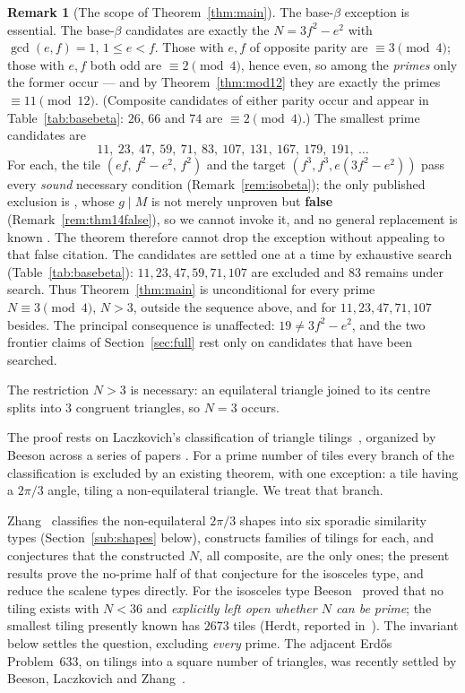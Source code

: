 \documentclass[11pt,reqno]{amsart}
\theoremstyle{plain}
\theoremstyle{definition}
\newtheorem{remark}[theorem]{Remark}
\begin{document}
\begin{remark}[The scope of Theorem~\ref{thm:main}]\label{rem:mainscope}
The base-$\beta$ exception is essential. The base-$\beta$ candidates are exactly the $N=3f^2-e^2$ with
$\gcd(e,f)=1$, $1\le e<f$. Those with $e,f$ of opposite parity are $\equiv3\pmod4$; those with $e,f$
both odd are $\equiv2\pmod4$, hence even, so among the \emph{primes} only the former occur --- and by
Theorem~\ref{thm:mod12} they are exactly the primes $\equiv11\pmod{12}$. (Composite candidates of
either parity occur and appear in Table~\ref{tab:basebeta}: $26$, $66$ and $74$ are $\equiv2\pmod4$.)
The smallest prime candidates are
\[ 11,\ 23,\ 47,\ 59,\ 71,\ 83,\ 107,\ 131,\ 167,\ 179,\ 191,\ \dots \]
For each, the tile $(ef,\,f^2-e^2,\,f^2)$ and the target $(f^3,f^3,e(3f^2-e^2))$ pass every
\emph{sound} necessary condition (Remark~\ref{rem:isobeta}); the only published exclusion is
\cite[Thm.~14]{BeesonIII}, whose $g\mid M$ is not merely unproven but \textbf{false}
(Remark~\ref{rem:thm14false}), so we cannot invoke it, and no general replacement is known \cite{Companion}. The theorem therefore cannot drop the exception without appealing to that
false citation. The candidates are settled one at a time by exhaustive search
(Table~\ref{tab:basebeta}): $11,23,47,59,71,107$ are excluded and $83$ remains under search. Thus
Theorem~\ref{thm:main} is unconditional for every prime
$N\equiv3\pmod4$, $N>3$, outside the sequence above, and for $11,23,47,71,107$ besides. The
principal consequence is unaffected: $19\ne3f^2-e^2$, and the two frontier claims of
Section~\ref{sec:full} rest only on candidates that have been searched.
\end{remark}

\noindent The restriction $N>3$ is necessary: an equilateral triangle joined to its centre splits
into $3$ congruent triangles, so $N=3$ occurs.

The proof rests on Laczkovich's classification of triangle tilings~\cite{Laczkovich1995,
Laczkovich2012}, organized by Beeson across a series of papers \cite{BeesonI, BeesonIII,
BeesonIso, BeesonSeven, BeesonEq}. For a prime number of tiles every branch of the classification
is excluded by an existing theorem, with one exception: a tile having a $2\pi/3$ angle, tiling a
non-equilateral triangle. We treat that branch.

Zhang~\cite{Zhang} classifies the non-equilateral
$2\pi/3$ shapes into six sporadic similarity types (Section~\ref{sub:shapes} below), constructs
families of tilings for each, and conjectures that the constructed $N$, all composite, are the only
ones; the present results prove the no-prime half of that conjecture for the isosceles type, and
reduce the scalene types directly. For the isosceles type Beeson~\cite{BeesonIso} proved that no
tiling exists with $N<36$ and \emph{explicitly left open whether $N$ can be prime}; the smallest
tiling presently known has $2673$ tiles (Herdt, reported in~\cite{BeesonIso}). The invariant below
settles the question, excluding \emph{every} prime. The adjacent Erd\H{o}s Problem~633, on tilings
into a square number of triangles, was recently settled by Beeson, Laczkovich and
Zhang~\cite{Erdos633}.
\end{document}
